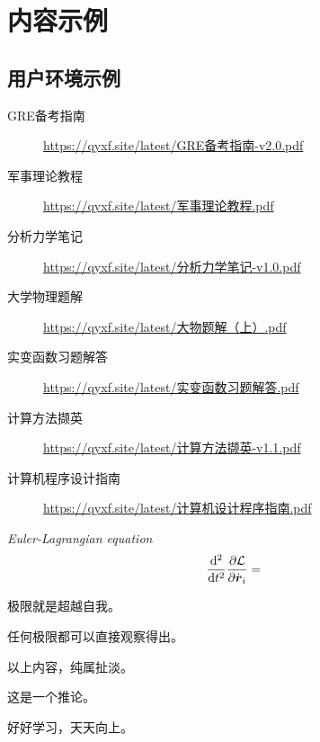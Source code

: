 
\chapter{内容示例}
\section{用户环境示例}

\begin{tcolorbox}
	\begin{description}
		\item [GRE备考指南] \url{https://qyxf.site/latest/GRE备考指南-v2.0.pdf}
		\item [军事理论教程] \url{https://qyxf.site/latest/军事理论教程.pdf}
		\item [分析力学笔记] \url{https://qyxf.site/latest/分析力学笔记-v1.0.pdf}
		\item [大学物理题解] \url{https://qyxf.site/latest/大物题解（上）.pdf}
		\item [实变函数习题解答] \url{https://qyxf.site/latest/实变函数习题解答.pdf}
		\item [计算方法撷英] \url{https://qyxf.site/latest/计算方法撷英-v1.1.pdf}
		\item [计算机程序设计指南] \url{https://qyxf.site/latest/计算机设计程序指南.pdf}
	\end{description}
\end{tcolorbox}

\begin{pequation}
	\textit{Euler-Lagrangian equation}
	$$
	\dfrac{\mathrm{d}^2 }{\mathrm{d} t^2}\dfrac{\partial \mathcal{L}}{\partial \dot{\boldsymbol{r}}_i}=
	$$
\end{pequation}

\begin{define}
	极限就是超越自我。
\end{define}

\begin{theorem}
	任何极限都可以直接观察得出。
\end{theorem}

\begin{lemma}
	以上内容，纯属扯淡。
\end{lemma}

\begin{corollary}
	这是一个推论。
\end{corollary}

\begin{note}
	好好学习，天天向上。
\end{note}

